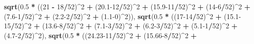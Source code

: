 \documentclass[]{article}
\newenvironment{Shaded}{\begin{snugshade}}{\end{snugshade}}
\newcommand{\DecValTok}[1]{\textcolor[rgb]{0.00,0.00,0.81}{#1}}
\newcommand{\FloatTok}[1]{\textcolor[rgb]{0.00,0.00,0.81}{#1}}
\newcommand{\KeywordTok}[1]{\textcolor[rgb]{0.13,0.29,0.53}{\textbf{#1}}}
\newcommand{\NormalTok}[1]{#1}
\newcommand{\OperatorTok}[1]{\textcolor[rgb]{0.81,0.36,0.00}{\textbf{#1}}}
\newcommand{\StringTok}[1]{\textcolor[rgb]{0.31,0.60,0.02}{#1}}
\begin{document}
\begin{Shaded}
\begin{Highlighting}[]
{{{{{{                                  \KeywordTok{sqrt}\NormalTok{(}\FloatTok{0.5} \OperatorTok{*}\StringTok{ }\NormalTok{((}\DecValTok{21} \OperatorTok{-}\StringTok{ }\DecValTok{18}\OperatorTok{/}\DecValTok{52}\NormalTok{)}\OperatorTok{^}\DecValTok{2} \OperatorTok{+}\StringTok{ }\NormalTok{(}\FloatTok{20.1}\DecValTok{-12}\OperatorTok{/}\DecValTok{52}\NormalTok{)}\OperatorTok{^}\DecValTok{2} \OperatorTok{+}
\StringTok{                                                }\NormalTok{(}\FloatTok{15.9}\DecValTok{-11}\OperatorTok{/}\DecValTok{52}\NormalTok{)}\OperatorTok{^}\DecValTok{2} \OperatorTok{+}
\StringTok{                                                }\NormalTok{(}\DecValTok{14-6}\OperatorTok{/}\DecValTok{52}\NormalTok{)}\OperatorTok{^}\DecValTok{2} \OperatorTok{+}\StringTok{ }\NormalTok{(}\FloatTok{7.6}\DecValTok{-1}\OperatorTok{/}\DecValTok{52}\NormalTok{)}\OperatorTok{^}\DecValTok{2} \OperatorTok{+}\StringTok{ }
\StringTok{                                                }\NormalTok{(}\FloatTok{2.2}\DecValTok{-2}\OperatorTok{/}\DecValTok{52}\NormalTok{)}\OperatorTok{^}\DecValTok{2} \OperatorTok{+}\StringTok{ }\NormalTok{(}\FloatTok{1.1}\DecValTok{-0}\NormalTok{)}\OperatorTok{^}\DecValTok{2}\NormalTok{)), }
                                  \KeywordTok{sqrt}\NormalTok{(}\FloatTok{0.5} \OperatorTok{*}\StringTok{ }\NormalTok{((}\DecValTok{17-14}\OperatorTok{/}\DecValTok{52}\NormalTok{)}\OperatorTok{^}\DecValTok{2} \OperatorTok{+}\StringTok{ }\NormalTok{(}\FloatTok{15.1}\DecValTok{-15}\OperatorTok{/}\DecValTok{52}\NormalTok{)}\OperatorTok{^}\DecValTok{2} \OperatorTok{+}
\StringTok{                                                }\NormalTok{(}\FloatTok{13.6}\DecValTok{-8}\OperatorTok{/}\DecValTok{52}\NormalTok{)}\OperatorTok{^}\DecValTok{2} \OperatorTok{+}\StringTok{ }
\StringTok{                                                }\NormalTok{(}\FloatTok{7.1}\DecValTok{-3}\OperatorTok{/}\DecValTok{52}\NormalTok{)}\OperatorTok{^}\DecValTok{2} \OperatorTok{+}\StringTok{ }\NormalTok{(}\FloatTok{6.2}\DecValTok{-3}\OperatorTok{/}\DecValTok{52}\NormalTok{)}\OperatorTok{^}\DecValTok{2} \OperatorTok{+}\StringTok{ }
\StringTok{                                                }\NormalTok{(}\FloatTok{5.1}\DecValTok{-1}\OperatorTok{/}\DecValTok{52}\NormalTok{)}\OperatorTok{^}\DecValTok{2} \OperatorTok{+}\StringTok{ }\NormalTok{(}\FloatTok{4.7}\DecValTok{-2}\OperatorTok{/}\DecValTok{52}\NormalTok{)}\OperatorTok{^}\DecValTok{2}\NormalTok{), }
                                  \KeywordTok{sqrt}\NormalTok{(}\FloatTok{0.5} \OperatorTok{*}\StringTok{ }\NormalTok{((}\FloatTok{24.23}\DecValTok{-11}\OperatorTok{/}\DecValTok{52}\NormalTok{)}\OperatorTok{^}\DecValTok{2} \OperatorTok{+}\StringTok{ }\NormalTok{(}\FloatTok{15.66}\DecValTok{-8}\OperatorTok{/}\DecValTok{52}\NormalTok{)}\OperatorTok{^}\DecValTok{2} \OperatorTok{+}
}}}}}}
\end{Highlighting}
\end{Shaded}
\end{document}
